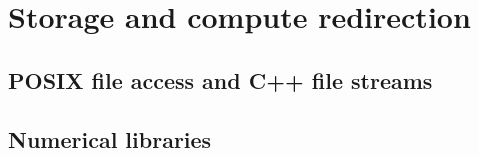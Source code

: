 \chapter{Storage and compute redirection}
\label{chap:redirect}


\section{POSIX file access and C++ file streams}

\section{Numerical libraries}
